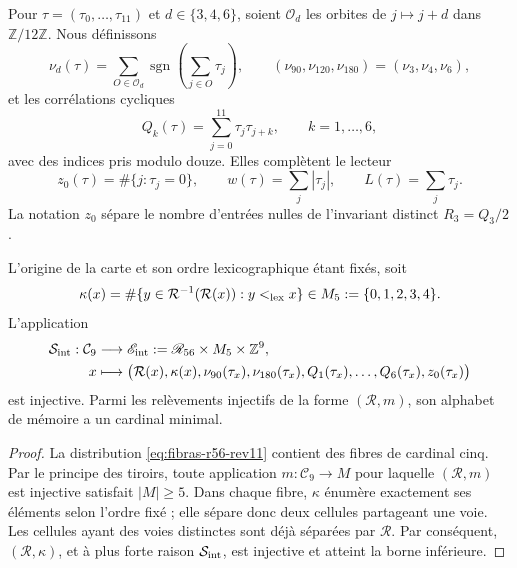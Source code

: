 Pour \(\tau=(\tau_0,\ldots,\tau_{11})\) et
\(d\in\{3,4,6\}\), soient \(\mathcal O_d\) les orbites de
\(j\mapsto j+d\) dans \(\mathbb Z/12\mathbb Z\). Nous définissons
\[
 \nu_d(\tau)=
 \sum_{O\in\mathcal O_d}
 \operatorname{sgn}\!\left(\sum_{j\in O}\tau_j\right),
 \qquad
 (\nu_{90},\nu_{120},\nu_{180})=(\nu_3,\nu_4,\nu_6),
\]
et les corrélations cycliques
\[
 Q_k(\tau)=\sum_{j=0}^{11}\tau_j\tau_{j+k},
 \qquad k=1,\ldots,6,
\]
avec des indices pris modulo douze. Elles complètent le lecteur
\[
 z_0(\tau)=\#\{j:\tau_j=0\},\qquad
 w(\tau)=\sum_j|\tau_j|,\qquad
 L(\tau)=\sum_j\tau_j.
\]
La notation \(z_0\) sépare le nombre d'entrées nulles de l'invariant distinct
\(R_3=Q_3/2\).

\begin{theorem}
\label{thm:selector-interno-minimo-rev11}
L'origine de la carte et son ordre lexicographique étant fixés, soit
\[
 \kappa(x)=
 \#\{y\in\mathcal R^{-1}(\mathcal R(x)):y<_{\rm lex}x\}
 \in M_5:=\{0,1,2,3,4\}.
\]
L'application
\begin{align}
 \mathcal S_{\rm int}:\mathcal C_9&\longrightarrow
 \mathscr E_{\rm int}:=\mathscr R_{56}\times M_5\times\mathbb Z^9,
 \notag\\
 x&\longmapsto
 \bigl(\mathcal R(x),\kappa(x),\nu_{90}(\tau_x),
 \nu_{180}(\tau_x),Q_1(\tau_x),\ldots,Q_6(\tau_x),z_0(\tau_x)\bigr)
 \label{eq:selector-interno-rev11}
\end{align}
est injective. Parmi les relèvements injectifs de la forme
\((\mathcal R,m)\), son alphabet de mémoire a un cardinal minimal.
\end{theorem}

\begin{proof}
La distribution \eqref{eq:fibras-r56-rev11} contient des fibres de cardinal
cinq. Par le principe des tiroirs, toute application \(m:\mathcal C_9\to M\) pour
laquelle \((\mathcal R,m)\) est injective satisfait \(|M|\geq5\). Dans
chaque fibre, \(\kappa\) énumère exactement ses éléments selon
l'ordre fixé ; elle sépare donc deux cellules partageant une voie. Les cellules ayant des
voies distinctes sont déjà séparées par \(\mathcal R\). Par conséquent,
\((\mathcal R,\kappa)\), et à plus forte raison
\(\mathcal S_{\rm int}\), est injective et atteint la borne inférieure.
\end{proof}

